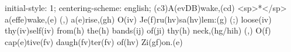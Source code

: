 initial-style: 1;
centering-scheme: english;
(c3)A(evDB)wake,(cd) <sp>*</sp> a(effe)wake,(e) (,) a(e)rise,(gh) O(iv) Je(f)ru(hv)sa(hv)lem:(g) (;) loose(iv) thy(iv)self(iv) from(h) the(h) bands(ij) of(ji) thy(h) neck,(hg/hih) (,) O(f) cap(e)tive(fv) daugh(fv)ter(fv) of(hv) Zi(gf)on.(e)
